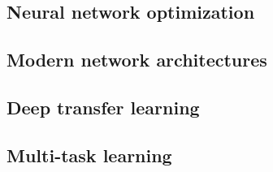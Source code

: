 \subsection{Neural network optimization}

\subsection{Modern network architectures}

\subsection{Deep transfer learning}

\subsection{Multi-task learning}

